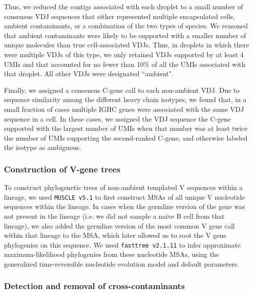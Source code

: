 Thus, we reduced the contigs associated with each droplet to a small number of consensus VDJ sequences that either represented multiple encapsulated cells, ambient contaminants, or a combination of the two types of species. We reasoned that ambient contaminants were likely to be supported with a smaller number of unique molecules than true cell-associated VDJs. Thus, in droplets in which there were multiple VDJs of this type, we only retained VDJs supported by at least 4 UMIs and that accounted for no fewer than 10\% of all the UMIs associated with that droplet. All other VDJs were designated ``ambient". 

Finally, we assigned a consensus C-gene call to each non-ambient VDJ. Due to sequence similarity among the different heavy chain isotypes, we found that, in a small fraction of cases multiple IGHC genes were associated with the same VDJ sequence in a cell. In these cases, we assigned the VDJ sequence the C-gene supported with the largest number of UMIs when that number was at least twice the number of UMIs supporting the second-ranked C-gene, and otherwise labeled the isotype as ambiguous.

\subsubsection{Construction of V-gene trees}
\noindent To construct phylogenetic trees of non-ambient templated V sequences within a lineage, we used \verb|MUSCLE v5.1| to first construct MSAs of all unique V nucleotide sequences within the lineage. In cases when the germline version of the gene was not present in the lineage (i.e. we did not sample a naive B cell from that lineage), we also added the germline version of the most common V gene call within that lineage to the MSA, which later allowed us to root the V gene phylogenies on this sequence. We used \verb|fasttree v2.1.11| to infer approximate maximum-likelihood phylogenies from these nucleotide MSAs, using the generalized time-reversible nucleotide evolution model and default parameters. 

\subsubsection{Detection and removal of cross-contaminants}

